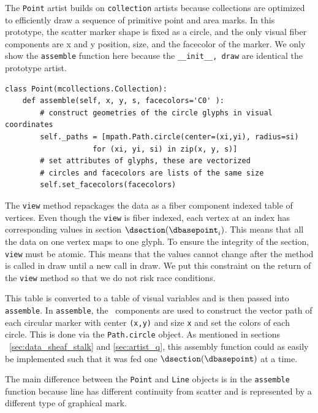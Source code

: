 \documentclass[../main.tex]{subfiles}
\begin{document}
The \texttt{Point} artist builds on \texttt{collection} artists because collections are optimized to efficiently draw a sequence of primitive point and area marks. In this prototype, the scatter marker shape is fixed as a circle, and the only visual fiber components are x and y position, size, and the facecolor of the marker. We only show the \texttt{assemble} function here because the \texttt{__init__, draw} are identical the prototype artist.
\begin{verbatim}
class Point(mcollections.Collection):
    def assemble(self, x, y, s, facecolors='C0' ):
        # construct geometries of the circle glyphs in visual coordinates
        self._paths = [mpath.Path.circle(center=(xi,yi), radius=si) 
                    for (xi, yi, si) in zip(x, y, s)] 
        # set attributes of glyphs, these are vectorized 
        # circles and facecolors are lists of the same size
        self.set_facecolors(facecolors)
\end{verbatim} 
The \texttt{view} method repackages the data as a fiber component indexed table of vertices. Even though the \texttt{view} is fiber indexed, each vertex at an index \dbasepoint has corresponding values in section $\dsection(\dbasepoint_{i})$. This means that all the data on one vertex maps to one glyph. To ensure the integrity of the section, \texttt{view} must be atomic. This means that the values cannot change after the method is called in draw until a new call in draw. We put this constraint on the return of the \texttt{view} method so that we do not risk race conditions. 

This table is converted to a table of visual variables and is then passed into \texttt{assemble}. In  \texttt{assemble}, the \vsection\ components are used to construct the vector path of each circular marker with center \texttt{(x,y)} and size \texttt{x} and set the colors of each circle. This is done via the \texttt{Path.circle} object. As mentioned in sections ~\ref{sec:data_sheaf_stalk} and \ref{sec:artist_q}, this assembly function could as easily be implemented such that it was fed one $\dsection(\dbasepoint)$ at a time. 

The main difference between the \texttt{Point} and \texttt{Line} objects is in the \texttt{assemble} function because line has different continuity from scatter and is represented by a different type of graphical mark. 
\end{document}
